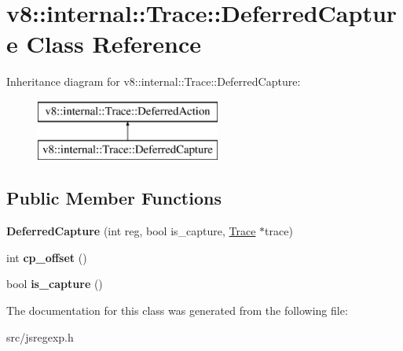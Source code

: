 \hypertarget{classv8_1_1internal_1_1_trace_1_1_deferred_capture}{}\section{v8\+:\+:internal\+:\+:Trace\+:\+:Deferred\+Capture Class Reference}
\label{classv8_1_1internal_1_1_trace_1_1_deferred_capture}
Inheritance diagram for v8\+:\+:internal\+:\+:Trace\+:\+:Deferred\+Capture\+:\begin{figure}[H]
\begin{center}
\leavevmode
\includegraphics[height=2.000000cm]{classv8_1_1internal_1_1_trace_1_1_deferred_capture}
\end{center}
\end{figure}
\subsection*{Public Member Functions}
\begin{DoxyCompactItemize}
\item 
\hypertarget{classv8_1_1internal_1_1_trace_1_1_deferred_capture_a20de459c31ae73a99b96e89a0364337f}{}{\bfseries Deferred\+Capture} (int reg, bool is\+\_\+capture, \hyperlink{classv8_1_1internal_1_1_trace}{Trace} $\ast$trace)\label{classv8_1_1internal_1_1_trace_1_1_deferred_capture_a20de459c31ae73a99b96e89a0364337f}

\item 
\hypertarget{classv8_1_1internal_1_1_trace_1_1_deferred_capture_ada13388019075f6a61a6da2cdfb617ad}{}int {\bfseries cp\+\_\+offset} ()\label{classv8_1_1internal_1_1_trace_1_1_deferred_capture_ada13388019075f6a61a6da2cdfb617ad}

\item 
\hypertarget{classv8_1_1internal_1_1_trace_1_1_deferred_capture_aad6bc18b74d133664b9eb67212ec8f0f}{}bool {\bfseries is\+\_\+capture} ()\label{classv8_1_1internal_1_1_trace_1_1_deferred_capture_aad6bc18b74d133664b9eb67212ec8f0f}

\end{DoxyCompactItemize}


The documentation for this class was generated from the following file\+:\begin{DoxyCompactItemize}
\item 
src/jsregexp.\+h\end{DoxyCompactItemize}
